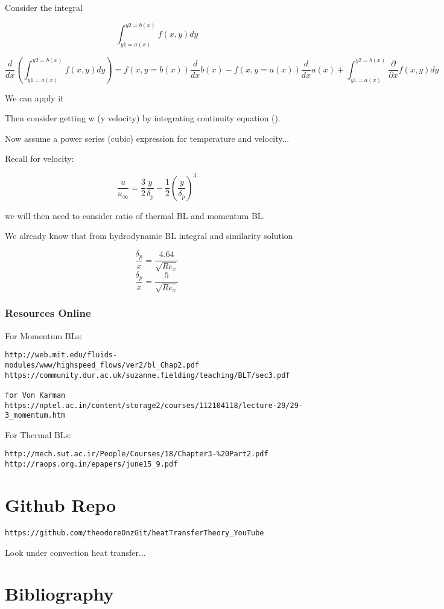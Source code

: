 \documentclass[11pt]{article}
\begin{document}
Consider the integral

$$\int_{y1=a(x)}^{y2=b(x)} f(x,y) dy$$

$$\frac{d}{dx} \left( \int_{y1=a(x)}^{y2=b(x)} f(x,y) dy \right)= f(x,y=b(x)) \frac{d}{dx}b(x) - f(x,y=a(x)) \frac{d}{dx} a(x)  +  \int_{y1=a(x)}^{y2=b(x)} \frac{\partial}{\partial x} f(x,y) dy $$


We can apply it


Then consider getting w (y velocity) by integrating continuity equation (\cite{bejan2013convection}).

Now assume a power series (cubic) expression for temperature and velocity...

Recall for velocity:

\begin{equation}
\frac{u}{u_\infty} = \frac{3}{2} \frac{y}{\delta_p} - \frac{1}{2} (\frac{y}{\delta_p})^3
\end{equation}

we will then need to consider ratio of thermal BL and momentum BL.

We already know that from hydrodynamic BL integral and similarity solution

$$\frac{\delta_p}{x} = \frac{4.64}{\sqrt{Re_x}}$$
$$\frac{\delta_p}{x} = \frac{5}{\sqrt{Re_x}}$$


\section{Resources Online}

For Momentum BLs:
\begin{verbatim}
http://web.mit.edu/fluids-modules/www/highspeed_flows/ver2/bl_Chap2.pdf
https://community.dur.ac.uk/suzanne.fielding/teaching/BLT/sec3.pdf

for Von Karman
https://nptel.ac.in/content/storage2/courses/112104118/lecture-29/29-3_momentum.htm
\end{verbatim}

For Thermal BLs:

\begin{verbatim}
http://mech.sut.ac.ir/People/Courses/18/Chapter3-%20Part2.pdf
http://raops.org.in/epapers/june15_9.pdf
\end{verbatim}

\part{Github Repo}
\begin{verbatim}
https://github.com/theodoreOnzGit/heatTransferTheory_YouTube
\end{verbatim}

Look under convection heat transfer...


\part{Bibliography}

\printbibliography
\end{document}
